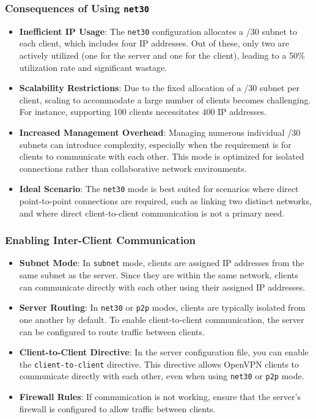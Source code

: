 \subsubsection{Consequences of Using \texttt{net30}}
\begin{itemize}
\item \textbf{Inefficient IP Usage}: The \texttt{net30} configuration allocates a /30 subnet to each client, which includes four IP addresses. Out of these, only two are actively utilized (one for the server and one for the client), leading to a 50\% utilization rate and significant wastage.
\item \textbf{Scalability Restrictions}: Due to the fixed allocation of a /30 subnet per client, scaling to accommodate a large number of clients becomes challenging. For instance, supporting 100 clients necessitates 400 IP addresses.
\item \textbf{Increased Management Overhead}: Managing numerous individual /30 subnets can introduce complexity, especially when the requirement is for clients to communicate with each other. This mode is optimized for isolated connections rather than collaborative network environments.
\item \textbf{Ideal Scenario}: The \texttt{net30} mode is best suited for scenarios where direct point-to-point connections are required, such as linking two distinct networks, and where direct client-to-client communication is not a primary need.
\end{itemize}

\subsubsection{Enabling Inter-Client Communication}
\begin{itemize}
    \item \textbf{Subnet Mode}: In \texttt{subnet} mode, clients are assigned IP addresses from the same subnet as the server. Since they are within the same network, clients can communicate directly with each other using their assigned IP addresses. 
    \item \textbf{Server Routing}: In \texttt{net30} or \texttt{p2p} modes, clients are typically isolated from one another by default. To enable client-to-client communication, the server can be configured to route traffic between clients.
    \item \textbf{Client-to-Client Directive}: In the server configuration file, you can enable the \texttt{client-to-client} directive. This directive allows OpenVPN clients to communicate directly with each other, even when using \texttt{net30} or \texttt{p2p} mode. 
    \item \textbf{Firewall Rules}: If communication is not working, ensure that the server's firewall is configured to allow traffic between clients.
\end{itemize}

